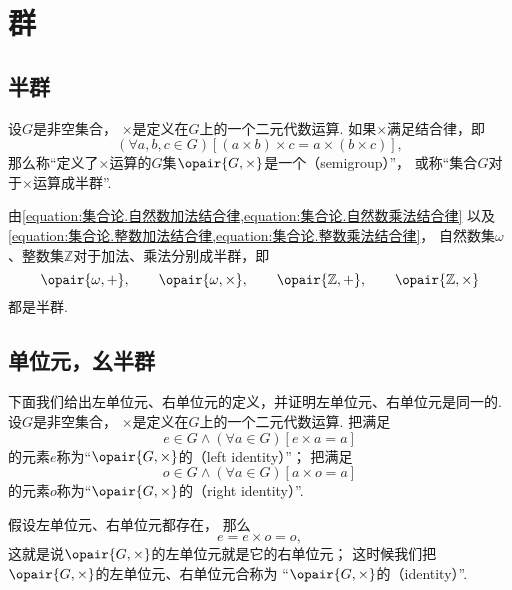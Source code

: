 \section{群}
\subsection{半群}
\begin{definition}\label{definition:抽象代数.半群的定义}
设\(G\)是非空集合，
\(\times\)是定义在\(G\)上的一个二元代数运算.
如果\(\times\)满足结合律，即\[
	(\forall a,b,c \in G)
	[(a \times b) \times c = a \times (b \times c)],
\]
那么称“定义了\(\times\)运算的\(G\)集\(\opair{G,\times}\)是一个（semigroup）”，
或称“集合\(G\)对于\(\times\)运算成半群”.
\end{definition}

由\cref{equation:集合论.自然数加法结合律,equation:集合论.自然数乘法结合律}
以及\cref{equation:集合论.整数加法结合律,equation:集合论.整数乘法结合律}，
自然数集\(\omega\)、整数集\(\mathbb{Z}\)对于加法、乘法分别成半群，即\[
	\opair{\omega,+}, \qquad
	\opair{\omega,\times}, \qquad
	\opair{\mathbb{Z},+}, \qquad
	\opair{\mathbb{Z},\times}
\]都是半群.

\subsection{单位元，幺半群}
下面我们给出左单位元、右单位元的定义，并证明左单位元、右单位元是同一的.
设\(G\)是非空集合，
\(\times\)是定义在\(G\)上的一个二元代数运算.
把满足\[
	e \in G
	\land
	(\forall a \in G)[e \times a = a]
\]的元素\(e\)称为“\(\opair{G,\times}\)的（left identity）”；
把满足\[
	o \in G
	\land
	(\forall a \in G)[a \times o = a]
\]的元素\(o\)称为“\(\opair{G,\times}\)的（right identity）”.

假设左单位元、右单位元都存在，
那么\[
	e = e \times o = o,
\]
这就是说\(\opair{G,\times}\)的左单位元就是它的右单位元；
这时候我们把\(\opair{G,\times}\)的左单位元、右单位元合称为%
“\(\opair{G,\times}\)的（identity）”.


